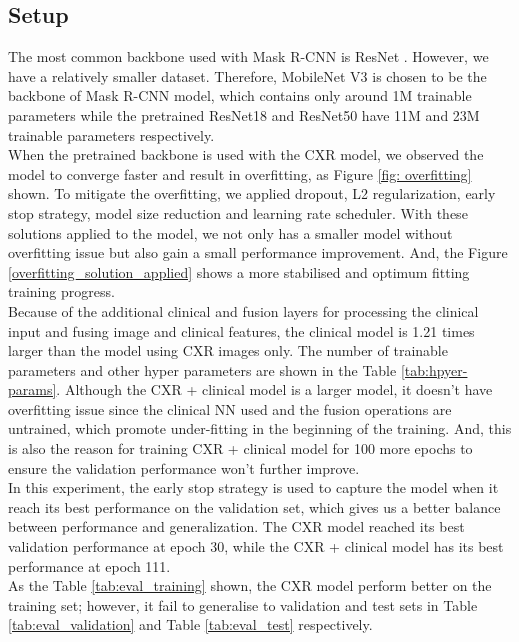 \documentclass[journal,twoside,web, 11pt]{ieeecolor}
\begin{document}
\subsection{Setup}

The most common backbone used with Mask R-CNN is ResNet \cite{}. However, we have a relatively smaller dataset. Therefore, MobileNet V3 is chosen to be the backbone of Mask R-CNN model, which contains only around 1M trainable parameters while the pretrained ResNet18 and ResNet50 have 11M and 23M trainable parameters respectively. \\

When the pretrained backbone is used with the CXR model, we observed the model to converge faster and result in overfitting, as Figure \ref{fig: overfitting} shown. To mitigate the overfitting, we applied dropout, L2 regularization, early stop strategy, model size reduction and learning rate scheduler. With these solutions applied to the model, we not only has a smaller model without overfitting issue but also gain a small performance improvement. And, the Figure \ref{overfitting_solution_applied} shows a more stabilised and optimum fitting training progress.\\

Because of the additional clinical and fusion layers for processing the clinical input and fusing image and clinical features, the clinical model is 1.21 times larger than the model using CXR images only. The number of trainable parameters and other hyper parameters are shown in the Table \ref{tab:hpyer-params}. Although the CXR + clinical model is a larger model, it doesn't have overfitting issue since the clinical NN used and the fusion operations are untrained, which promote under-fitting in the beginning of the training. And, this is also the reason for training CXR + clinical model for 100 more epochs to ensure the validation performance won't further improve.\\

In this experiment, the early stop strategy is used to capture the model when it reach its best performance on the validation set, which gives us a better balance between performance and generalization. The CXR model reached its best validation performance at epoch 30, while the CXR + clinical model has its best performance at epoch 111.\\

As the Table \ref{tab:eval_training} shown, the CXR model perform better on the training set; however, it fail to generalise to validation and test sets in Table \ref{tab:eval_validation} and Table  \ref{tab:eval_test} respectively.\\
\end{document}
